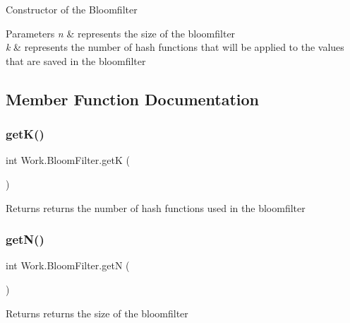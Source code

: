 Constructor of the Bloomfilter


\begin{DoxyParams}{Parameters}
{\em n} & represents the size of the bloomfilter \\
\hline
{\em k} & represents the number of hash functions that will be applied to the values that are saved in the bloomfilter \\
\hline
\end{DoxyParams}


\subsection{Member Function Documentation}
\mbox{\label{classWork_1_1BloomFilter_ac84e30c9b46982f948bcc7b19a4551b0}} 
\subsubsection{\texorpdfstring{get\+K()}{getK()}}
{\footnotesize\ttfamily int Work.\+Bloom\+Filter.\+getK (\begin{DoxyParamCaption}{ }\end{DoxyParamCaption})\hspace{0.3cm}{\ttfamily [inline]}}

\begin{DoxyReturn}{Returns}
returns the number of hash functions used in the bloomfilter 
\end{DoxyReturn}
\mbox{\label{classWork_1_1BloomFilter_a51b12111700fe438437ea4a3e417a448}} 
\subsubsection{\texorpdfstring{get\+N()}{getN()}}
{\footnotesize\ttfamily int Work.\+Bloom\+Filter.\+getN (\begin{DoxyParamCaption}{ }\end{DoxyParamCaption})\hspace{0.3cm}{\ttfamily [inline]}}

\begin{DoxyReturn}{Returns}
returns the size of the bloomfilter 
\end{DoxyReturn}
\mbox{\label{classWork_1_1BloomFilter_a43575a7e07ba726869e99467e123bc76}} 
